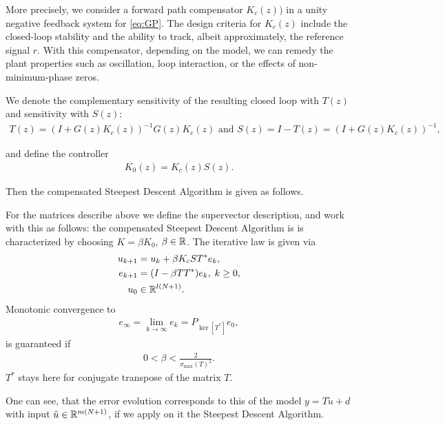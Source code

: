 More precisely, we consider a forward path compensator $K_c(z))$ in a unity negative feedback system for \eqref{eq:GP}. 
The design criteria for $K_c(z)$ include the closed-loop stability and the ability to track, albeit approximately, the reference signal $r$. With this compensator, depending on the model, we can remedy the plant properties such as oscillation, loop interaction, or the effects of non-minimum-phase zeros. 

We denote the complementary sensitivity of the resulting closed loop with $T(z)$ and sensitivity with $S(z)$:
\begin{align}
T(z) = (I + G(z) K_c(z))^{-1}G(z) K_c(z) \text{ and } S(z)  = I - T(z) =  (I + G(z) K_c(z))^{-1}, 
\end{align}

and define the controller
\begin{align}
K_0(z) = K_c(z) S(z). 
\end{align}

Then the compensated Steepest Descent Algorithm is given as follows. 

\begin{alg}
	\label{alg: FBDesign}
	For the matrices describe above we define the supervector description, and work with this as follows:
	the compensated Steepest Descent Algorithm is  is characterized by choosing  $K = \beta K_0$, $\beta \in {\mathbb{R}}$. 
	The iterative law is given via 
	\begin{align}
	\label{eq:errFBDesign}
	\begin{split}
	u_{k+1} &= u_k + \beta K_c S T^* e_k, \\
	e_{k+1} &= (I- \beta T T^*) e_{k}, \; k\geq 0,\\
	u_0& \in {\mathbb{R}}^{l (N+1)}. 
	\end{split}	
	\end{align}
	Monotonic convergence to 
	\begin{align}
	\label{eq:FDErrLim} 
	e_\infty  = \lim_{k\to\infty} e_k = P_{\ker[T^*]}e_0,
	\end{align} 
	is guaranteed if
	\begin{align*}
	0 <\beta < \frac{2}{\sigma_{\max}(T)^2}.
\end{align*}
$T^*$ stays here for conjugate transpose of the matrix $T$. 
\end{alg}

One can see, that the error evolution corresponds to this of the model $y = T \tilde{u} + d$ with input $\tilde{u} 
\in {\mathbb{R}}^{m(N+1)}$, if we apply on it the Steepest Descent Algorithm.

